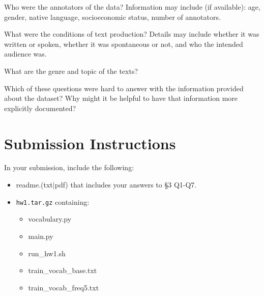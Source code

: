 \documentclass[11pt]{article}
\begin{document}
\vspace{2em}
 Who were the annotators of the data?  Information may include (if available): age, gender, native language, socioeconomic status, number of annotators.

\vspace{2em}
 What were the conditions of text production?  Details may include whether it was written or spoken, whether it was spontaneous or not, and who the intended audience was.

\vspace{2em}
 What are the genre and topic of the texts?

\vspace{2em}
  Which of these questions were hard to answer with the information provided about the dataset?  Why might it be helpful to have that information more explicitly documented?

\section*{Submission Instructions}

In your submission, include the following:
\begin{itemize}
  \item readme.(txt$\mid$pdf) that includes your answers to \S3 Q1-Q7. 
  \item \texttt{hw1.tar.gz} containing:
  \begin{itemize}
    \item vocabulary.py
    \item main.py
    \item run\_hw1.sh
    \item train\_vocab\_base.txt
    \item train\_vocab\_freq5.txt
  \end{itemize}
\end{itemize}
\end{document}
